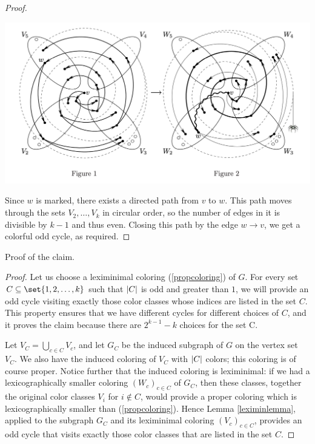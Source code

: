\begin{problem}
\begin{proof}
\begin{center}
\includegraphics[width=18cm]{spider.png}
\label{fig:spider}
\end{center}

Since $w$ is marked, there exists a directed path from $v$ to $w$. This path moves through the sets $V_2, \dots , V_k$ in circular order, so the number of edges in it is divisible by $k - 1$ and thus even.
Closing this path by the edge $w \rightarrow v$, we get a colorful odd cycle, as required.
\end{proof}

Proof of the claim. 
\begin{proof}
Let us choose a leximinimal coloring (\ref{propcoloring}) of $G$. For every set $C \subseteq  \set{1, 2, \dots, k}$ such that $\lvert C\rvert$ is odd and greater than $1$, we will provide an odd cycle visiting exactly those color classes whose indices are listed in the set $C$. This property ensures that we have different cycles for different choices of $C$, and it proves the claim because there are $2^{k-1} - k$ choices for the set C.


Let $V_C = \bigcup_{c \in C}V_c$, and let $G_C$ be the induced subgraph of $G$ on the vertex set $V_C$. We also have the induced coloring of $V_C$ with $\lvert C\rvert$ colors; this coloring is of course proper. Notice further that the induced coloring is leximinimal: if we had a lexicographically smaller coloring  
$(W_c)_{c \in C}$ of $G_C$, then these classes, together the original color classes $V_i$ for $i \notin C$, would provide a proper coloring which is lexicographically smaller than (\ref{propcoloring}). Hence Lemma \ref{leximinlemma}, applied to the subgraph $G_C$ and its leximinimal coloring $(V_c)_{c \in C}$, provides an odd cycle that visits exactly those color classes that are listed in the set $C$. 
\end{proof}
\end{problem}
%
\filbreak

